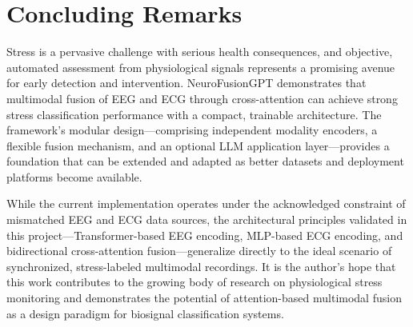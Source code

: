 \documentclass[12pt,letterpaper]{report}
\begin{document}
\section{Concluding Remarks}
\label{sec:concluding}

Stress is a pervasive challenge with serious health consequences, and objective, automated assessment from physiological signals represents a promising avenue for early detection and intervention. NeuroFusionGPT demonstrates that multimodal fusion of EEG and ECG through cross-attention can achieve strong stress classification performance with a compact, trainable architecture. The framework's modular design---comprising independent modality encoders, a flexible fusion mechanism, and an optional LLM application layer---provides a foundation that can be extended and adapted as better datasets and deployment platforms become available.

While the current implementation operates under the acknowledged constraint of mismatched EEG and ECG data sources, the architectural principles validated in this project---Transformer-based EEG encoding, MLP-based ECG encoding, and bidirectional cross-attention fusion---generalize directly to the ideal scenario of synchronized, stress-labeled multimodal recordings. It is the author's hope that this work contributes to the growing body of research on physiological stress monitoring and demonstrates the potential of attention-based multimodal fusion as a design paradigm for biosignal classification systems.


\clearpage
{}
{}
\end{document}
